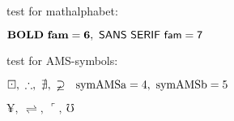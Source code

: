 \documentclass{article}
\begin{document}
test for mathalphabet:\par
$\mathbf{BOLD\ fam=\the\fam},\ 
 \mathsf{SANS\ SERIF\ fam=\the\fam}$

\bigskip
test for AMS-symbols:\par
$\boxdot,\ \therefore,\ \nexists,\ \varsupsetneq\ \ 
\mathrm{symAMSa=\the\symAMSa,\ symAMSb=\the\symAMSb}$

$\yen,\ \rightleftharpoons,\ \ulcorner,\ \mho$
\end{document}
